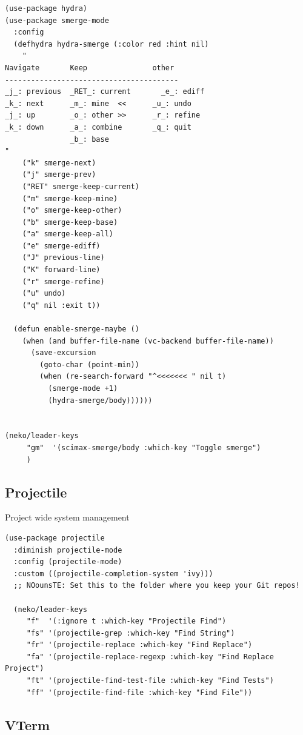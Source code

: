 \documentclass[11pt]{article}
\begin{document}
\begin{verbatim}
(use-package hydra)
(use-package smerge-mode
  :config
  (defhydra hydra-smerge (:color red :hint nil)
    "
Navigate       Keep               other
----------------------------------------
_j_: previous  _RET_: current       _e_: ediff
_k_: next      _m_: mine  <<      _u_: undo
_j_: up        _o_: other >>      _r_: refine
_k_: down      _a_: combine       _q_: quit
               _b_: base
"
    ("k" smerge-next)
    ("j" smerge-prev)
    ("RET" smerge-keep-current)
    ("m" smerge-keep-mine)
    ("o" smerge-keep-other)
    ("b" smerge-keep-base)
    ("a" smerge-keep-all)
    ("e" smerge-ediff)
    ("J" previous-line)
    ("K" forward-line)
    ("r" smerge-refine)
    ("u" undo)
    ("q" nil :exit t))

  (defun enable-smerge-maybe ()
    (when (and buffer-file-name (vc-backend buffer-file-name))
      (save-excursion
        (goto-char (point-min))
        (when (re-search-forward "^<<<<<<< " nil t)
          (smerge-mode +1)
          (hydra-smerge/body))))))


(neko/leader-keys
     "gm"  '(scimax-smerge/body :which-key "Toggle smerge")
     )

\end{verbatim}

\subsection{Projectile}
\label{sec:orged5d2f2}

Project wide system management

\begin{verbatim}
(use-package projectile
  :diminish projectile-mode
  :config (projectile-mode)
  :custom ((projectile-completion-system 'ivy)))
  ;; NOounsTE: Set this to the folder where you keep your Git repos!

  (neko/leader-keys
     "f"  '(:ignore t :which-key "Projectile Find")
     "fs" '(projectile-grep :which-key "Find String")
     "fr" '(projectile-replace :which-key "Find Replace")
     "fa" '(projectile-replace-regexp :which-key "Find Replace Project")
     "ft" '(projectile-find-test-file :which-key "Find Tests")
     "ff" '(projectile-find-file :which-key "Find File"))
\end{verbatim}

\subsection{VTerm}
\label{sec:orge9ee7aa}
\end{document}
